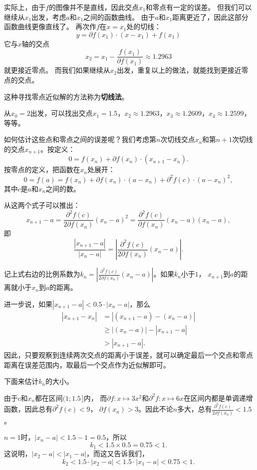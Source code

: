 \documentclass[12pt,UTF8,fontset=none]{ctexbook}
\begin{document}
实际上，由于$f$的图像并不是直线，因此交点$x_1$和零点有一定的误差。
但我们可以继续从$x_1$出发，考虑$a$和$x_1$之间的函数曲线。
由于$a$和$x_1$距离更近了，因此这部分函数曲线更像直线了。
再次作$f$在$x=x_1$处的切线：
$$ y = \partial f(x_1)\cdot (x - x_1) + f(x_1) $$
它与$x$轴的交点
$$ x_2 = x_1 - \frac{f(x_1)}{\partial f(x_1)} \approx 1.2963 $$
就更接近零点。
而我们如果继续从$x_2$出发，重复以上的做法，就能找到更接近零点的交点。

这种寻找零点近似解的方法称为\textbf{切线法}。

从$x_0=2$出发，可以找出交点$x_1 = 1.5$，$x_2 \approx 1.2963$，$x_3 \approx 1.2609$，$x_4 \approx 1.2599$，等等。

如何估计这些点和零点之间的误差呢？我们考虑第$n$次切线交点$x_n$和第$n+1$次切线的交点$x_{n+1}$。按定义：
$$ 0 = f(x_n) + \partial f(x_n)\cdot (x_{n+1} - x_n). $$
按零点的定义，把函数在$x_n$处展开：
$$ 0 = f(a) = f(x_n) + \partial f(x_n)\cdot (a - x_n) + \partial^2 f(c)\cdot (a - x_n)^2, $$
其中$c$是$a$和$x_n$之间的数。

从这两个式子可以推出：
$$ x_{n+1} - a = \frac{\partial^2 f(c)}{2\partial f(x_n)} (x_n - a)^2 = \frac{\partial^2 f(c)}{\partial f(x_n)} (x_n - a)(x_n - a),$$
即
$$ \frac{\left| x_{n+1} - a \right|}{\left| x_n - a \right|} = \left| \frac{\partial^2 f(c)}{2\partial f(x_n)} (x_n - a)\right|.$$

记上式右边的比例系数为$k_n =  \left|\frac{\partial^2 f(c)}{2\partial f(x_n)} (x_n - a)\right|$。如果$k_n$小于$1$，
$x_{n+1}$到$a$的距离就小于$x_n$到$a$的距离。

进一步说，如果$\left| x_{n+1} - a \right| < 0.5 \cdot \left| x_n - a \right|$，那么
\begin{align*}
    \left| x_{n+1} - x_n \right| &= \left| (x_{n+1} - a) - (x_n - a) \right| \\
    &\geqslant  \left| (x_n - a) \right| - \left| x_{n+1} - a \right| \\
    &> \left| x_{n+1} - a \right|.
\end{align*}
因此，只要观察到连续两次交点的距离小于误差，就可以确定最后一个交点和零点距离在误差范围内，取最后一个交点作为近似解即可。

下面来估计$k_n$的大小。

由于$c$和$x_n$都在区间$(1;1.5\,]$内，
而$\partial f: x\mapsto 3x^2$和$\partial^2 f: x\mapsto 6x$在区间内都是单调递增函数，因此总有$\partial^2 f(c) < 9$，
$\partial f(x_n) > 3$。因此不论$n$多大，总有$\frac{\partial^2 f(c)}{2\partial f(x_n)} < 1.5$。

$n=1$时，$|x_n - a| < 1.5 - 1 = 0.5$，所以
$$k_1 < 1.5 \times 0.5 = 0.75 < 1.$$
这说明，$|x_2 - a| < |x_1 - a|$，而这又告诉我们，
$$k_2 < 1.5 \cdot |x_2 - a| < 1.5 \cdot |x_1 - a| <0.75 < 1.$$
\end{document}
